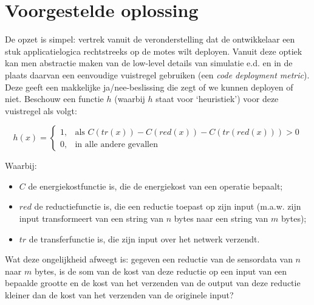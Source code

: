 \documentclass[11pt]{article}
\begin{document}
\section{Voorgestelde oplossing}
De opzet is simpel: vertrek vanuit de veronderstelling dat de ontwikkelaar een
stuk applicatielogica rechtstreeks op de motes wilt deployen. Vanuit deze optiek
kan men abstractie maken van de low-level details van simulatie e.d. en in de plaats daarvan een eenvoudige vuistregel gebruiken (een \textit{code
deployment metric}). Deze geeft een makkelijke ja/nee-beslissing die zegt of we
kunnen deployen of niet. Beschouw een functie $h$ (waarbij $h$ staat voor
`heuristiek') voor deze vuistregel als volgt:


\[
h(x)= 
\begin{cases}
  1, & \text{als } C(tr(x)) - C(red(x)) - C(tr(red(x))) > 0  \\
  0, & \text{in alle andere gevallen}
\end{cases}
\]

Waarbij:

\begin{itemize}
\item $C$ de energiekostfunctie is, die de energiekost van een operatie bepaalt;
\item $red$ de reductiefunctie is, die een reductie toepast op zijn input
(m.a.w. zijn input transformeert van een string van $n$ bytes naar een string
van $m$ bytes);
\item $tr$ de transferfunctie is, die zijn input over het netwerk verzendt.
\end{itemize}

Wat deze ongelijkheid afweegt is: gegeven een reductie van de sensordata van $n$ naar
$m$ bytes, is de som van de kost van deze reductie op een input van een bepaalde
grootte en de kost van het verzenden van de output van deze reductie kleiner dan
de kost van het verzenden van de originele input?
\end{document}
